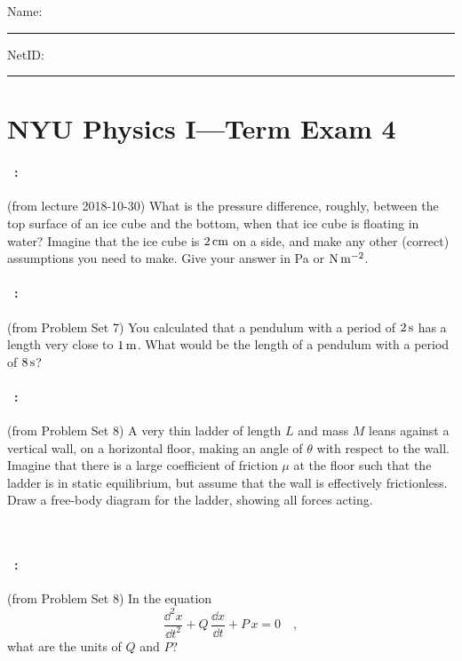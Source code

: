 \documentclass[12pt]{article} 
\begin{document}
\noindent
Name: \rule[-1ex]{0.55\textwidth}{0.1pt}
NetID: \rule[-1ex]{0.2\textwidth}{0.1pt}

\section*{NYU Physics I---Term Exam 4}

\paragraph{\problemname~\theproblem:}%
(from lecture 2018-10-30)
What is the pressure difference, roughly, between the top surface
of an ice cube and the bottom, when that ice cube is floating in water?
Imagine that the ice cube is $2\,\mathrm{cm}$ on a side, and make any other
(correct) assumptions you need to make. Give your answer in Pa or $\mathrm{N}\,\mathrm{m}^{-2}$.

\vfill

\paragraph{\problemname~\theproblem:}%
(from Problem Set 7)
You calculated that a pendulum with a period of $2\,\mathrm{s}$ has a length
very close to $1\,\mathrm{m}$. What would be the length of a pendulum with
a period of $8\,\mathrm{s}$?

\vfill

\paragraph{\problemname~\theproblem:}%
(from Problem Set 8)
A very thin ladder of length $L$ and mass $M$ leans against a
vertical wall, on a horizontal floor, making an angle of $\theta$ with respect to the
wall. Imagine that there is a large coefficient of friction $\mu$ at the floor such that
the ladder is in static equilibrium, but assume that the wall is effectively
frictionless. Draw a free-body diagram for the ladder, showing all forces acting.

\vfill
~
\clearpage

\paragraph{\problemname~\theproblem:}%
(from Problem Set 8)
In the equation
$$
\frac{\dd^2 x}{\dd t^2} + Q\,\frac{\dd x}{\dd t} + P\,x = 0 \quad ,
$$ what are the units of $Q$ and $P$?
\end{document}
